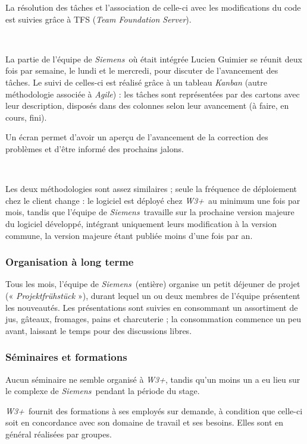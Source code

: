 \documentclass[a4paper, oneside, 12pt]{article}
\def\www{\emph{W3+}}
\def\siemens{\emph{Siemens}}
\begin{document}
La résolution des tâches et l’association de celle-ci avec les modifications du code est suivies grâce à TFS (\emph{Team Foundation Server}).

\ 

La partie de l’équipe de \siemens\ où était intégrée Lucien {\sc Guimier} se réunit deux fois par semaine, le lundi et le mercredi, pour discuter de l’avancement des tâches. Le suivi de celles-ci est réalisé grâce à un tableau \emph{Kanban} (autre méthodologie associée à \emph{Agile}) : les tâches sont représentées par des cartons avec leur description, disposés dans des colonnes selon leur avancement (à faire, en cours, fini).

Un écran permet d’avoir un aperçu de l’avancement de la correction des problèmes et d’être informé des prochains jalons.

\ 

Les deux méthodologies sont assez similaires ; seule la fréquence de déploiement chez le client change : le logiciel est déployé chez \www\ au minimum une fois par mois, tandis que l’équipe de \siemens\ travaille sur la prochaine version majeure du logiciel développé, intégrant uniquement leurs modification à la version commune, la version majeure étant publiée moins d’une fois par an.

\newpage

\subsubsection{Organisation à long terme}

Tous les mois, l’équipe de \siemens\ (entière) organise un petit déjeuner de projet (« \textit{Projektfrühstück} »), durant lequel un ou deux membres de l’équipe présentent les nouveautés. Les présentations sont suivies en consommant un assortiment de jus, gâteaux, fromages, pains et charcuterie ; la consommation commence un peu avant, laissant le temps pour des discussions libres.

\subsubsection{Séminaires et formations}

Aucun séminaire ne semble organisé à \www, tandis qu’un moins un a eu lieu sur le complexe de \siemens\ pendant la période du stage.

\www\ fournit des formations à ses employés sur demande, à condition que celle-ci soit en concordance avec son domaine de travail et ses besoins. Elles sont en général réalisées par groupes.
\end{document}
